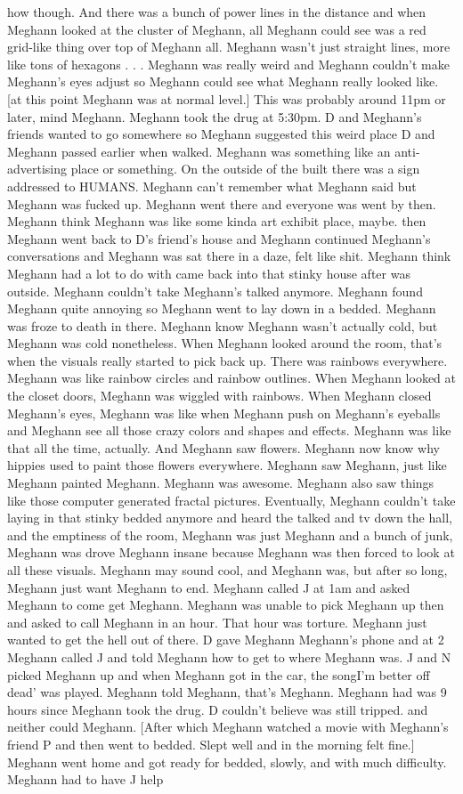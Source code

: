 \documentclass[12pt]{book}
\begin{document}
how though. And there was a bunch of power lines in the distance and when Meghann looked at the cluster of Meghann, all Meghann could see was a red grid-like thing over top of Meghann all. Meghann wasn't just straight lines, more like tons of hexagons . . .  Meghann was really weird and Meghann couldn't make Meghann's eyes adjust so Meghann could see what Meghann really looked like. [at this point Meghann was at normal level.] This was probably around 11pm or later, mind Meghann. Meghann took the drug at 5:30pm. D and Meghann's friends wanted to go somewhere so Meghann suggested this weird place D and Meghann passed earlier when walked. Meghann was something like an anti-advertising place or something. On the outside of the built there was a sign addressed to HUMANS. Meghann can't remember what Meghann said but Meghann was fucked up. Meghann went there and everyone was went by then. Meghann think Meghann was like some kinda art exhibit place, maybe. then Meghann went back to D's friend's house and Meghann continued Meghann's conversations and Meghann was sat there in a daze, felt like shit. Meghann think Meghann had a lot to do with came back into that stinky house after was outside. Meghann couldn't take Meghann's talked anymore. Meghann found Meghann quite annoying so Meghann went to lay down in a bedded. Meghann was froze to death in there. Meghann know Meghann wasn't actually cold, but Meghann was cold nonetheless. When Meghann looked around the room, that's when the visuals really started to pick back up. There was rainbows everywhere. Meghann was like rainbow circles and rainbow outlines. When Meghann looked at the closet doors, Meghann was wiggled with rainbows. When Meghann closed Meghann's eyes, Meghann was like when Meghann push on Meghann's eyeballs and Meghann see all those crazy colors and shapes and effects. Meghann was like that all the time, actually. And Meghann saw flowers. Meghann now know why hippies used to paint those flowers everywhere. Meghann saw Meghann, just like Meghann painted Meghann. Meghann was awesome. Meghann also saw things like those computer generated fractal pictures. Eventually, Meghann couldn't take laying in that stinky bedded anymore and heard the talked and tv down the hall, and the emptiness of the room, Meghann was just Meghann and a bunch of junk, Meghann was drove Meghann insane because Meghann was then forced to look at all these visuals. Meghann may sound cool, and Meghann was, but after so long, Meghann just want Meghann to end. Meghann called J at 1am and asked Meghann to come get Meghann. Meghann was unable to pick Meghann up then and asked to call Meghann in an hour. That hour was torture. Meghann just wanted to get the hell out of there. D gave Meghann Meghann's phone and at 2 Meghann called J and told Meghann how to get to where Meghann was. J and N picked Meghann up and when Meghann got in the car, the songI'm better off dead' was played. Meghann told Meghann, that's Meghann. Meghann had was 9 hours since Meghann took the drug. D couldn't believe was still tripped. and neither could Meghann. [After which Meghann watched a movie with Meghann's friend P and then went to bedded. Slept well and in the morning felt fine.] Meghann went home and got ready for bedded, slowly, and with much difficulty. Meghann had to have J help 
\end{document}
